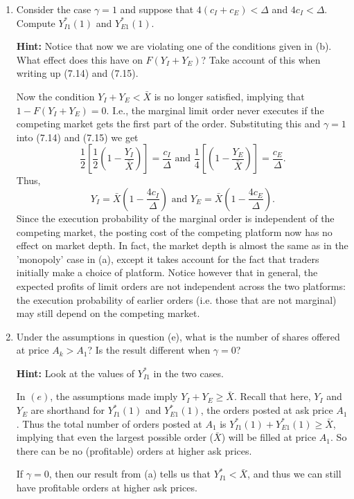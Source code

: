 \documentclass[11pt
, answers
]{exam}
\begin{document}
\begin{enumerate}[label=(\alph*). ]
	
	
	\item Consider the case $\gamma=1$ and suppose that $4(c_{I}+c_{E})<\Delta$ and $4c_{I}<\Delta$. Compute $Y^{*}_{I1}(1)$ and $Y^{*}_{E1}(1)$.
	
	\textbf{Hint:} Notice that now we are violating one of the conditions given in (b). What effect does this have on $F(Y_{I}+Y_{E})$? Take account of this when writing up (7.14) and (7.15).
	
	\begin{solution}
		Now the condition $Y_{I}+Y_{E}<\bar{X}$ is no longer satisfied, implying that $1-F(Y_{I}+Y_{E})=0$. I.e., the marginal limit order never executes if the competing market gets the first part of the order.  Substituting this and $\gamma=1$ into (7.14) and (7.15) we get
		\[
		\frac{1}{2} \left[\frac{1}{2} \left(1-\frac{Y_{I}}{\bar{X}}\right)\right]=\frac{c_{I}}{\Delta} \text{ and } \frac{1}{4} \left[\left(1-\frac{Y_{E}}{\bar{X}}\right)\right]=\frac{c_{E}}{\Delta}.
		\]
		Thus, 
		\[
		Y_{I} = \bar{X}\left(1-\frac{4c_{I}}{\Delta}\right) \text{ and } Y_{E} = \bar{X}\left(1-\frac{4c_{E}}{\Delta}\right).
		\]
		Since the execution probability of the marginal order is independent of the competing market, the posting cost of the competing platform now has no effect on market depth. In fact, the market depth is almost the same as in the 'monopoly' case in (a), except it takes account for the fact that traders initially make a choice of platform. Notice however that in general, the expected profits of limit orders are not independent across the two platforms: the execution probability of earlier orders (i.e. those that are not marginal) may still depend on the competing market.
	\end{solution}
	
	
	
	\item Under the assumptions in question (e), what is the number of shares offered at price $A_{k}>A_{1}$? Is the result different when $\gamma=0$?
	
	\textbf{Hint:} Look at the values of $Y^{*}_{I1}$ in the two cases.
	
	\begin{solution}
		In $(e)$, the assumptions made imply  $Y_{I}+Y_{E} \geq \bar{X}$. Recall that here, $Y_I$ and $Y_E$ are shorthand for $Y^*_{I1}(1)$ and $Y^*_{E1}(1)$, the orders posted at ask price $A_1$. Thus the total number of orders posted at $A_1$ is $Y^*_{I1}(1)+Y^*_{E1}(1) \geq \bar{X}$, implying that even the largest possible order ($\bar{X}$) will be filled at price $A_1$. So there can be no (profitable) orders at higher ask prices. 
		
		If $\gamma=0$, then our result from (a) tells us that $Y^{*}_{I1}<\bar{X}$, and thus we can still have profitable orders at higher ask prices.
	\end{solution}

\end{enumerate}
\end{document}

